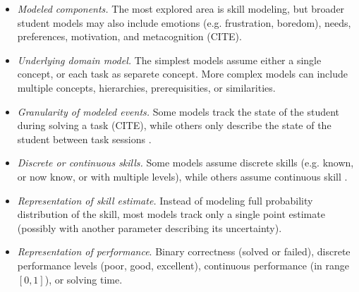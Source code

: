 \begin{itemize}
\item \emph{Modeled components.}
The most explored area is skill modeling, but broader student models may also
include emotions (e.g. frustration, boredom), needs, preferences, motivation,
and metacognition (CITE).
\item \emph{Underlying domain model.}
The simplest models assume either a single concept,
or each task as separete concept. %
More complex models can include multiple concepts,
hierarchies, prerequisities, or similarities.
\item \emph{Granularity of modeled events.}
Some models track the state of the student during solving a task
(CITE), %
while others only describe the state of the student between task sessions
\cite{kli-framework}. %
\item \emph{Discrete or continuous skills.}
Some models assume discrete skills (e.g. known, or now know, or with multiple levels),
while others assume continuous skill
\cite{pelanek-learner-modeling}.
\item \emph{Representation of skill estimate.}
Instead of modeling full probability distribution of the skill, %
most models track only a single point estimate
(possibly with another parameter describing its uncertainty).
\item \emph{Representation of performance}.
  Binary correctness (solved or failed),
  discrete performance levels (poor, good, excellent),
  continuous performance (in range $[0, 1]$),
  or solving time.

\end{itemize}
